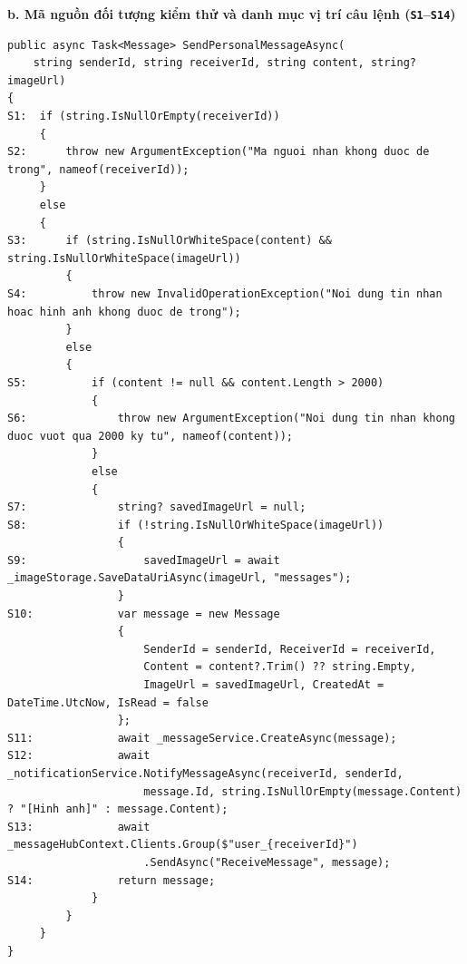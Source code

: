 \documentclass[11pt,a4paper]{article}
\begin{document}
\noindent\textbf{b. Mã nguồn đối tượng kiểm thử và danh mục vị trí câu lệnh (\texttt{S1}--\texttt{S14})}
\begin{lstlisting}[language={[Sharp]C}]
public async Task<Message> SendPersonalMessageAsync(
    string senderId, string receiverId, string content, string? imageUrl)
{
S1:  if (string.IsNullOrEmpty(receiverId))
     {
S2:      throw new ArgumentException("Ma nguoi nhan khong duoc de trong", nameof(receiverId));
     }
     else
     {
S3:      if (string.IsNullOrWhiteSpace(content) && string.IsNullOrWhiteSpace(imageUrl))
         {
S4:          throw new InvalidOperationException("Noi dung tin nhan hoac hinh anh khong duoc de trong");
         }
         else
         {
S5:          if (content != null && content.Length > 2000)
             {
S6:              throw new ArgumentException("Noi dung tin nhan khong duoc vuot qua 2000 ky tu", nameof(content));
             }
             else
             {
S7:              string? savedImageUrl = null;
S8:              if (!string.IsNullOrWhiteSpace(imageUrl))
                 {
S9:                  savedImageUrl = await _imageStorage.SaveDataUriAsync(imageUrl, "messages");
                 }
S10:             var message = new Message
                 {
                     SenderId = senderId, ReceiverId = receiverId,
                     Content = content?.Trim() ?? string.Empty,
                     ImageUrl = savedImageUrl, CreatedAt = DateTime.UtcNow, IsRead = false
                 };
S11:             await _messageService.CreateAsync(message);
S12:             await _notificationService.NotifyMessageAsync(receiverId, senderId,
                     message.Id, string.IsNullOrEmpty(message.Content) ? "[Hinh anh]" : message.Content);
S13:             await _messageHubContext.Clients.Group($"user_{receiverId}")
                     .SendAsync("ReceiveMessage", message);
S14:             return message;
             }
         }
     }
}
\end{lstlisting}
\end{document}
